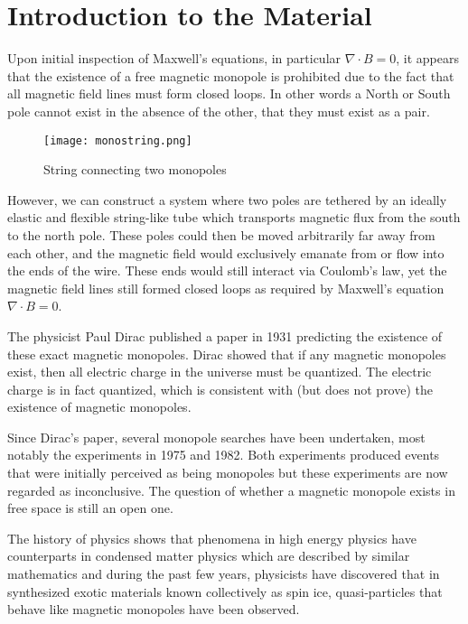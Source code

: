 \section{Introduction to the Material}
Upon initial inspection of Maxwell's equations, in particular $\nabla \cdot B = 0$, it appears that the existence of a free magnetic monopole is prohibited due to the fact that all magnetic field lines must form closed loops. In other words a North or South pole cannot exist in the absence of the other, that they must exist as a pair.
\par
\begin{figure}[ht!]
    \begin{center}
        \texttt{[image: monostring.png]}
        \caption[String connecting two monopoles]{String connecting two monopoles}
        \label{fig:gf15}
    \end{center}
\end{figure}
However, we can construct a system where two poles are tethered by an ideally elastic and flexible string-like tube which transports magnetic flux from the south to the north pole. These poles could then be moved arbitrarily far away from each other, and the magnetic field would exclusively emanate from or flow into the ends of the wire. These ends would still interact via Coulomb's law, yet the magnetic field lines still formed closed loops as required by Maxwell's equation $\nabla \cdot B = 0$.
\par
The physicist Paul Dirac published a paper in 1931 predicting the existence of these exact magnetic monopoles.{\cite{b1}}  Dirac showed that if any magnetic monopoles exist, then all electric charge in the universe must be quantized.  The electric charge is in fact quantized, which is consistent with (but does not prove) the existence of magnetic monopoles.
\par
Since Dirac's paper, several monopole searches have been undertaken, most notably the experiments in 1975{\cite{b2}} and 1982.{\cite{b3}}  Both experiments produced events that were initially perceived as being monopoles but these experiments are now regarded as inconclusive.  The question of whether a magnetic monopole exists in free space is still an open one.{\cite{b4}}
\par
The history of physics shows that phenomena in high energy physics have counterparts in condensed matter physics which are described by similar mathematics and during the past few years, physicists have discovered that in synthesized exotic materials known collectively as spin ice, quasi-particles that behave like magnetic monopoles have been observed.
